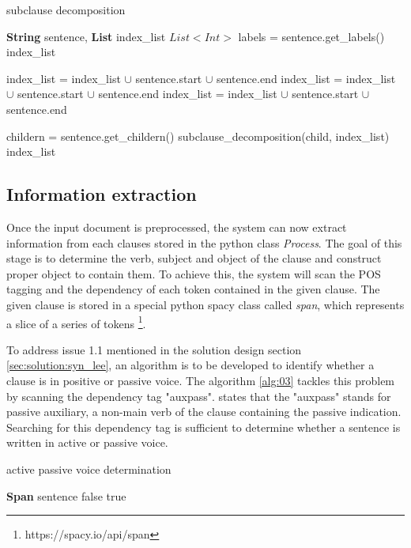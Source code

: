 \begin{algorithm}
\caption{subclause decomposition}
\label{alg:02}
	\begin{algorithmic} [1]
		\REQUIRE \textbf{String} sentence, \textbf{List} index\_list
			\STATE $List<Int>$ labels = sentence.get\_labels()
			\RETURN index\_list
			\ENDIF 
			
			\STATE index\_list = index\_list $\cup$ sentence.start $\cup$ sentence.end
			\STATE index\_list = index\_list $\cup$ sentence.start $\cup$ sentence.end 
			\STATE index\_list = index\_list $\cup$ sentence.start $\cup$ sentence.end
			\ENDIF
			\ENDIF
			
			\STATE childern = sentence.get\_childern()
				\STATE subclause\_decomposition(child, index\_list)
			\ENDFOR
			\RETURN index\_list
	\end{algorithmic}
\end{algorithm}

\subsection{Information extraction}
Once the input document is preprocessed, the system can now extract information from each clauses stored in the python class \textit{Process}. The goal of this stage is to determine the verb, subject and object of the clause and construct proper object to contain them. To achieve this, the system will scan the POS tagging and the dependency of each token contained in the given clause. The given clause is stored in a special python spacy class called \textit{span}, which represents a slice of a series of tokens \footnote{https://spacy.io/api/span}.

To address issue 1.1 mentioned in the solution design section \ref{sec:solution:syn_lee}, an algorithm is to be developed to identify whether a clause is in positive or passive voice. The algorithm \ref{alg:03} tackles this problem by scanning the dependency tag "auxpass". \cite{dependencies_manual} states that the "auxpass" stands for passive auxiliary, a non-main verb of the clause containing the passive indication. Searching for this dependency tag is sufficient to determine whether a sentence is written in active or passive voice. 

\begin{algorithm}
\caption{active passive voice determination}
\label{alg:03}
	\begin{algorithmic} [1]
		\REQUIRE \textbf{Span} sentence
		\RETURN false
		\ENDIF
		\ENDFOR
		\RETURN true
	\end{algorithmic}
\end{algorithm}

